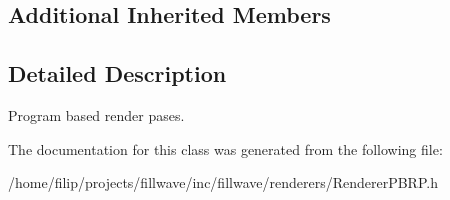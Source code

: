 \subsection*{Additional Inherited Members}


\subsection{Detailed Description}
Program based render pases. 

The documentation for this class was generated from the following file\+:\begin{DoxyCompactItemize}
\item 
/home/filip/projects/fillwave/inc/fillwave/renderers/Renderer\+P\+B\+R\+P.\+h\end{DoxyCompactItemize}
